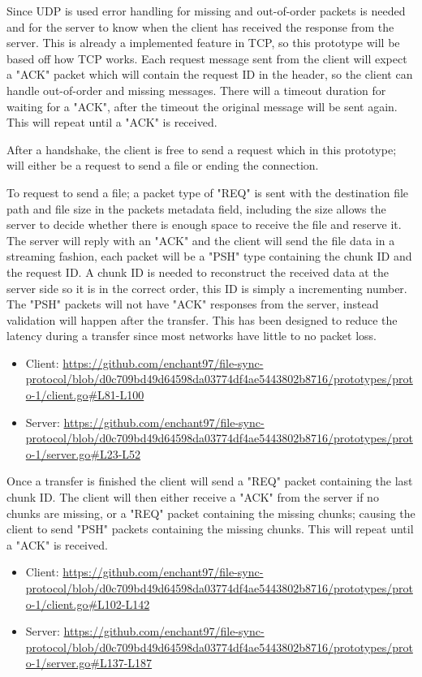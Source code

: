 Since UDP is used error handling for missing and out-of-order packets is needed and for the server to know when the client has received the response from the server. This is already a implemented feature in TCP, so this prototype will be based off how TCP works. Each request message sent from the client will expect a "ACK" packet which will contain the request ID in the header, so the client can handle out-of-order and missing messages. There will a timeout duration for waiting for a "ACK", after the timeout the original message will be sent again. This will repeat until a "ACK" is received.

After a handshake, the client is free to send a request which in this prototype; will either be a request to send a file or ending the connection.

To request to send a file; a packet type of "REQ" is sent with the destination file path and file size in the packets metadata field, including the size allows the server to decide whether there is enough space to receive the file and reserve it. The server will reply with an "ACK" and the client will send the file data in a streaming fashion, each packet will be a "PSH" type containing the chunk ID and the request ID. A chunk ID is needed to reconstruct the received data at the server side so it is in the correct order, this ID is simply a incrementing number. The "PSH" packets will not have "ACK" responses from the server, instead validation will happen after the transfer. This has been designed to reduce the latency during a transfer since most networks have little to no packet loss.

\begin{itemize}
    \item Client: \url{https://github.com/enchant97/file-sync-protocol/blob/d0c709bd49d64598da03774df4ae5443802b8716/prototypes/proto-1/client.go#L81-L100}
    \item Server: \url{https://github.com/enchant97/file-sync-protocol/blob/d0c709bd49d64598da03774df4ae5443802b8716/prototypes/proto-1/server.go#L23-L52}
\end{itemize}

Once a transfer is finished the client will send a "REQ" packet containing the last chunk ID. The client will then either receive a "ACK" from the server if no chunks are missing, or a "REQ" packet containing the missing chunks; causing the client to send "PSH" packets containing the missing chunks. This will repeat until a "ACK" is received.


\begin{itemize}
    \item Client: \url{https://github.com/enchant97/file-sync-protocol/blob/d0c709bd49d64598da03774df4ae5443802b8716/prototypes/proto-1/client.go#L102-L142}
    \item Server: \url{https://github.com/enchant97/file-sync-protocol/blob/d0c709bd49d64598da03774df4ae5443802b8716/prototypes/proto-1/server.go#L137-L187}
\end{itemize}

